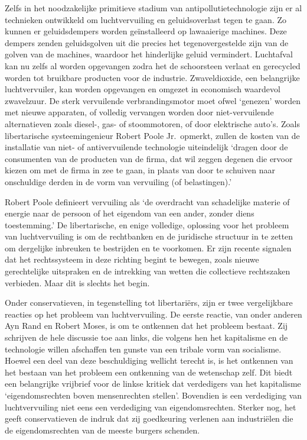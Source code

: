\documentclass[
  a5paper,
  smalldemyvopaper,10pt,twoside,onecolumn,openright,extrafontsizes,hidelinks]{memoir}
\begin{document}
Zelfs in het noodzakelijke primitieve stadium van
antipollutietechnologie zijn er al technieken ontwikkeld om
luchtvervuiling en geluidsoverlast tegen te gaan. Zo kunnen er
geluidsdempers worden geïnstalleerd op lawaaierige machines. Deze
dempers zenden geluidsgolven uit die precies het tegenovergestelde zijn
van de golven van de machines, waardoor het hinderlijke geluid
vermindert. Luchtafval kan nu zelfs al worden opgevangen zodra het de
schoorsteen verlaat en gerecycled worden tot bruikbare producten voor de
industrie. Zwaveldioxide, een belangrijke luchtvervuiler, kan worden
opgevangen en omgezet in economisch waardevol zwavelzuur. De sterk
vervuilende verbrandingsmotor moet ofwel `genezen' worden met nieuwe
apparaten, of volledig vervangen worden door niet-vervuilende
alternatieven zoals diesel-, gas- of stoommotoren, of door elektrische
auto's. Zoals libertarische systeemingenieur Robert Poole Jr.~opmerkt,
zullen de kosten van de installatie van niet- of antivervuilende
technologie uiteindelijk `dragen door de consumenten van de producten
van de firma, dat wil zeggen degenen die ervoor kiezen om met de firma
in zee te gaan, in plaats van door te schuiven naar onschuldige derden
in de vorm van vervuiling (of belastingen).'

Robert Poole definieert vervuiling als `de overdracht van schadelijke
materie of energie naar de persoon of het eigendom van een ander, zonder
diens toestemming.' De libertarische, en enige volledige, oplossing voor
het probleem van luchtvervuiling is om de rechtbanken en de juridische
structuur in te zetten om dergelijke inbreuken te bestrijden en te
voorkomen. Er zijn recente signalen dat het rechtssysteem in deze
richting begint te bewegen, zoals nieuwe gerechtelijke uitspraken en de
intrekking van wetten die collectieve rechtszaken verbieden. Maar dit is
slechts het begin.

Onder conservatieven, in tegenstelling tot libertariërs, zijn er twee
vergelijkbare reacties op het probleem van luchtvervuiling. De eerste
reactie, van onder anderen Ayn Rand en Robert Moses, is om te ontkennen
dat het probleem bestaat. Zij schrijven de hele discussie toe aan links,
die volgens hen het kapitalisme en de technologie willen afschaffen ten
gunste van een tribale vorm van socialisme. Hoewel een deel van deze
beschuldiging wellicht terecht is, is het ontkennen van het bestaan van
het probleem een ontkenning van de wetenschap zelf. Dit biedt een
belangrijke vrijbrief voor de linkse kritiek dat verdedigers van het
kapitalisme `eigendomsrechten boven mensenrechten stellen'. Bovendien is
een verdediging van luchtvervuiling niet eens een verdediging van
eigendomsrechten. Sterker nog, het geeft conservatieven de indruk dat
zij goedkeuring verlenen aan industriëlen die de eigendomsrechten van de
meeste burgers schenden.
\end{document}
